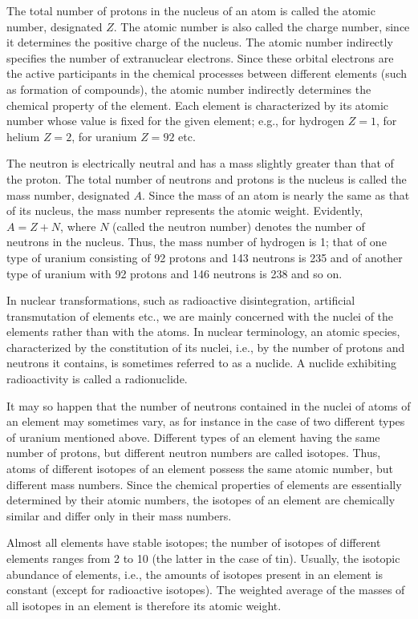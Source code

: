 The total number of protons in the nucleus of an atom is called the atomic number, designated $Z$.
The atomic number is also called the charge number, since it determines the positive charge of the nucleus.
The atomic number indirectly specifies the number of extranuclear electrons.
Since these orbital electrons are the active participants in the chemical processes between different elements (such as formation of compounds), the atomic number indirectly determines the chemical property of the element.
Each element is characterized by its atomic number whose value is fixed for the given element; e.g., for hydrogen $Z=1$, for helium $Z=2$, for uranium $Z=92$ etc.
 
The neutron is electrically neutral and has a mass slightly greater than that of the proton.
The total number of neutrons and protons is the nucleus is called the mass number, designated $A$.
Since the mass of an atom is nearly the same as that of its nucleus, the mass number represents the atomic weight.
Evidently, $A = Z + N$, where $N$ (called the neutron number) denotes the number of neutrons in the nucleus.
Thus, the mass number of hydrogen is 1; that of one type of uranium consisting of 92 protons and 143 neutrons is 235 and of another type of uranium with 92 protons and 146 neutrons is 238 and so on.
 
In nuclear transformations, such as radioactive disintegration, artificial transmutation of elements etc., we are mainly concerned with the nuclei of the elements rather than with the atoms.
In nuclear terminology, an atomic species, characterized by the constitution of its nuclei, i.e., by the number of protons and neutrons it contains, is sometimes referred to as a nuclide.
A nuclide exhibiting radioactivity is called a radionuclide.
 
It may so happen that the number of neutrons contained in the nuclei of atoms of an element may sometimes vary, as for instance in the case of two different types of uranium mentioned above.
Different types of an element having the same number of protons, but different neutron numbers are called isotopes.
Thus, atoms of different isotopes of an element possess the same atomic number, but different mass numbers.
Since the chemical properties of elements are essentially determined by their atomic numbers, the isotopes of an element are chemically similar and differ only in their mass numbers.
 
Almost all elements have stable isotopes; the number of isotopes of different elements ranges from 2 to 10 (the latter in the case of tin).
Usually, the isotopic abundance of elements, i.e., the amounts of isotopes present in an element is constant (except for radioactive isotopes).
The weighted average of the masses of all isotopes in an element is therefore its atomic weight.
 
